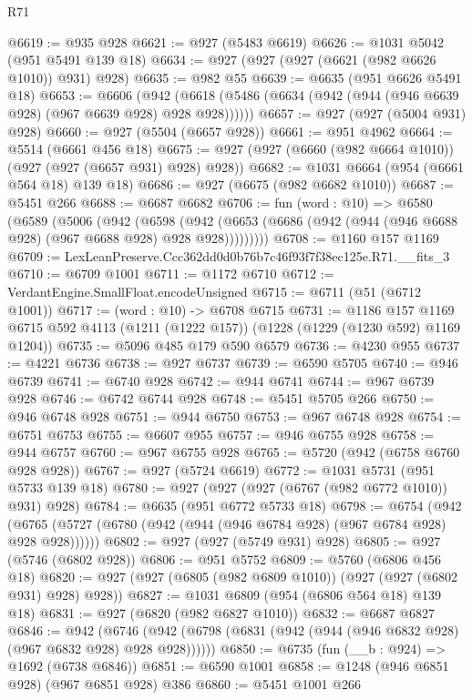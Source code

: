 \begin{lexlean}{R71}
\begin{coremodule}
@6619 := @935 @928
@6621 := @927 (@5483 @6619)
@6626 := @1031 @5042 (@951 @5491 @139 @18)
@6634 := @927 (@927 (@927 (@6621 (@982 @6626 @1010)) @931) @928)
@6635 := @982 @55
@6639 := @6635 (@951 @6626 @5491 @18)
@6653 := @6606
    (@942 (@6618 (@5486 (@6634 (@942 (@944 (@946 @6639 @928) (@967 @6639 @928) @928 @928))))))
@6657 := @927 (@927 (@5004 @931) @928)
@6660 := @927 (@5504 (@6657 @928))
@6661 := @951 @4962
@6664 := @5514 (@6661 @456 @18)
@6675 := @927 (@927 (@6660 (@982 @6664 @1010)) (@927 (@927 (@6657 @931) @928) @928))
@6682 := @1031 @6664 (@954 (@6661 @564 @18) @139 @18)
@6686 := @927 (@6675 (@982 @6682 @1010))
@6687 := @5451 @266
@6688 := @6687 @6682
@6706 := fun (word : @10) =>
  @6580
    (@6589
      (@5006
        (@942
          (@6598
            (@942 (@6653 (@6686 (@942 (@944 (@946 @6688 @928) (@967 @6688 @928) @928 @928)))))))))
@6708 := @1160 @157 @1169
@6709 := LexLeanPreserve.Ccc362dd0d0b76b7c46f93f7f38ec125e.R71.__fits_3
@6710 := @6709 @1001
@6711 := @1172 @6710
@6712 := VerdantEngine.SmallFloat.encodeUnsigned
@6715 := @6711 (@51 (@6712 @1001))
@6717 := (word : @10) -> @6708 @6715
@6731 := @1186
    @157
    @1169
    @6715
    @592
    @4113
    (@1211 (@1222 @157))
    (@1228 (@1229 (@1230 @592) @1169 @1204))
@6735 := @5096 @485 @179 @590 @6579
@6736 := @4230 @955
@6737 := @4221 @6736
@6738 := @927 @6737
@6739 := @6590 @5705
@6740 := @946 @6739
@6741 := @6740 @928
@6742 := @944 @6741
@6744 := @967 @6739 @928
@6746 := @6742 @6744 @928
@6748 := @5451 @5705 @266
@6750 := @946 @6748 @928
@6751 := @944 @6750
@6753 := @967 @6748 @928
@6754 := @6751 @6753
@6755 := @6607 @955
@6757 := @946 @6755 @928
@6758 := @944 @6757
@6760 := @967 @6755 @928
@6765 := @5720 (@942 (@6758 @6760 @928 @928))
@6767 := @927 (@5724 @6619)
@6772 := @1031 @5731 (@951 @5733 @139 @18)
@6780 := @927 (@927 (@927 (@6767 (@982 @6772 @1010)) @931) @928)
@6784 := @6635 (@951 @6772 @5733 @18)
@6798 := @6754
    (@942 (@6765 (@5727 (@6780 (@942 (@944 (@946 @6784 @928) (@967 @6784 @928) @928 @928))))))
@6802 := @927 (@927 (@5749 @931) @928)
@6805 := @927 (@5746 (@6802 @928))
@6806 := @951 @5752
@6809 := @5760 (@6806 @456 @18)
@6820 := @927 (@927 (@6805 (@982 @6809 @1010)) (@927 (@927 (@6802 @931) @928) @928))
@6827 := @1031 @6809 (@954 (@6806 @564 @18) @139 @18)
@6831 := @927 (@6820 (@982 @6827 @1010))
@6832 := @6687 @6827
@6846 := @942
    (@6746 (@942 (@6798 (@6831 (@942 (@944 (@946 @6832 @928) (@967 @6832 @928) @928 @928))))))
@6850 := @6735 (fun (__b : @924) => @1692 (@6738 @6846))
@6851 := @6590 @1001
@6858 := @1248 (@946 @6851 @928) (@967 @6851 @928) @386
@6860 := @5451 @1001 @266

\end{coremodule}
\end{lexlean}
